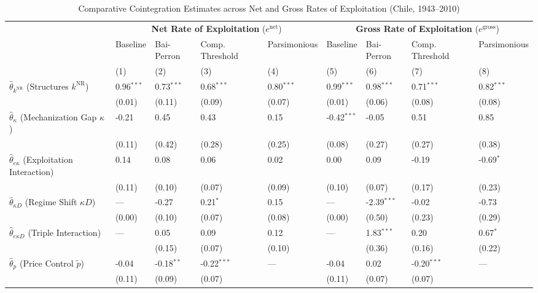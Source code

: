\begin{table}[h!]
	\centering
	\caption{Comparative Cointegration Estimates across Net and Gross Rates of Exploitation (Chile, 1943--2010)}
	\label{tab:chile_e_comparison}
	\small
	\begin{tabular}{p{3.5cm}p{1.35cm}p{1.35cm}p{1.35cm}p{1.35cm}p{1.35cm}p{1.35cm}p{1.35cm}p{1.35cm}}
		\toprule
		& \multicolumn{4}{c}{\textbf{Net Rate of Exploitation} ($e^{\text{net}}$)} & \multicolumn{4}{c}{\textbf{Gross Rate of Exploitation} ($e^{\text{gross}}$)} \\
		\cmidrule(lr){2-5} \cmidrule(lr){6-9}
		& Baseline & Bai-Perron & Comp. Threshold & Parsimonious & Baseline & Bai-Perron & Comp. Threshold & Parsimonious \\
		& (1) & (2) & (3) & (4) & (5) & (6) & (7) & (8) \\
		\midrule
		$\hat{\theta}_{k^{\text{NR}}}$ (Structures $k^{\text{NR}}$) & 0.96$^{***}$ & 0.73$^{***}$ & 0.68$^{***}$ & 0.80$^{***}$ & 0.99$^{***}$ & 0.98$^{***}$ & 0.71$^{***}$ & 0.82$^{***}$ \\
		& (0.01) & (0.11) & (0.09) & (0.07) & (0.01) & (0.06) & (0.08) & (0.08) \\
		$\hat{\theta}_{\kappa}$ (Mechanization Gap $\kappa$) & -0.21 & 0.45 & 0.43 & 0.15 & -0.42$^{***}$ & -0.05 & 0.51 & 0.85 \\
		& (0.11) & (0.42) & (0.28) & (0.25) & (0.08) & (0.27) & (0.27) & (0.38) \\
		$\hat{\theta}_{e\kappa}$ (Exploitation Interaction) & 0.14 & 0.08 & 0.06 & 0.02 & 0.00 & 0.09 & -0.19 & -0.69$^{*}$ \\
		& (0.11) & (0.10) & (0.07) & (0.09) & (0.10) & (0.07) & (0.17) & (0.23) \\
		$\hat{\theta}_{\kappa D}$ (Regime Shift $\kappa D$) & — & -0.27 & 0.21$^{*}$ & 0.15 & — & -2.39$^{***}$ & -0.02 & -0.73 \\
		& (0.00) & (0.10) & (0.07) & (0.08) & (0.00) & (0.50) & (0.23) & (0.29) \\
		$\hat{\theta}_{e\kappa D}$ (Triple Interaction) & — & 0.05 & 0.09 & 0.12 & — & 1.83$^{***}$ & 0.20 & 0.67$^{*}$ \\
		&  & (0.15) & (0.07) & (0.10) &  & (0.36) & (0.16) & (0.22) \\
		$\hat{\theta}_{p}$ (Price Control $\tilde{p}$) & -0.04 & -0.18$^{**}$ & -0.22$^{***}$ & — & -0.04 & 0.02 & -0.20$^{***}$ & — \\
		& (0.11) & (0.09) & (0.07) &  & (0.11) & (0.07) & (0.07) &  \\
		\midrule

\end{tabular}
\end{table}
